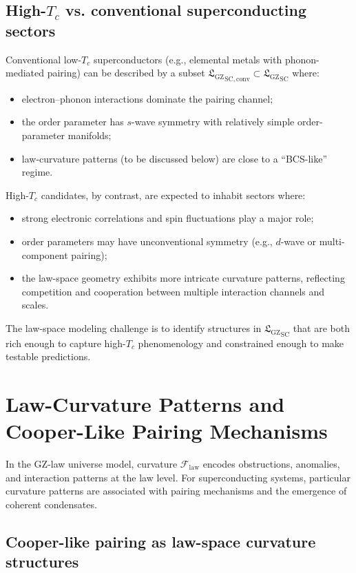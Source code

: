 \documentclass[11pt]{book}
\newcommand{\GZLS}{\ensuremath{\mathfrak{L}_{\mathrm{GZ}}}}
\newcommand{\GZLCurv}{\ensuremath{\mathcal{F}_{\mathrm{law}}}}
\theoremstyle{plain}
\theoremstyle{definition}
\theoremstyle{remark}
\begin{document}
\subsection*{High-$T_c$ vs. conventional superconducting sectors}

Conventional low-$T_c$ superconductors (e.g., elemental metals with
phonon-mediated pairing) can be described by a subset
${\GZLS}_{\mathrm{SC,conv}} \subset {\GZLS}_{\mathrm{SC}}$ where:
\begin{itemize}
  \item electron–phonon interactions dominate the pairing channel;
  \item the order parameter has $s$-wave symmetry with relatively
        simple order-parameter manifolds;
  \item law-curvature patterns (to be discussed below) are close to
        a ``BCS-like'' regime.
\end{itemize}

High-$T_c$ candidates, by contrast, are expected to inhabit sectors
where:
\begin{itemize}
  \item strong electronic correlations and spin fluctuations play a
        major role;
  \item order parameters may have unconventional symmetry (e.g.,
        $d$-wave or multi-component pairing);
  \item the law-space geometry exhibits more intricate curvature
        patterns, reflecting competition and cooperation between
        multiple interaction channels and scales.
\end{itemize}

The law-space modeling challenge is to identify structures in
${\GZLS}_{\mathrm{SC}}$ that are both rich enough to capture high-$T_c$
phenomenology and constrained enough to make testable predictions.

\section{Law-Curvature Patterns and Cooper-Like Pairing Mechanisms}
\label{sec:lawcurv-cooper-like}


In the GZ-law universe model, curvature $\GZLCurv$ encodes
obstructions, anomalies, and interaction patterns at the law level.
For superconducting systems, particular curvature patterns are
associated with pairing mechanisms and the emergence of coherent
condensates.

\subsection*{Cooper-like pairing as law-space curvature structures}
\end{document}
